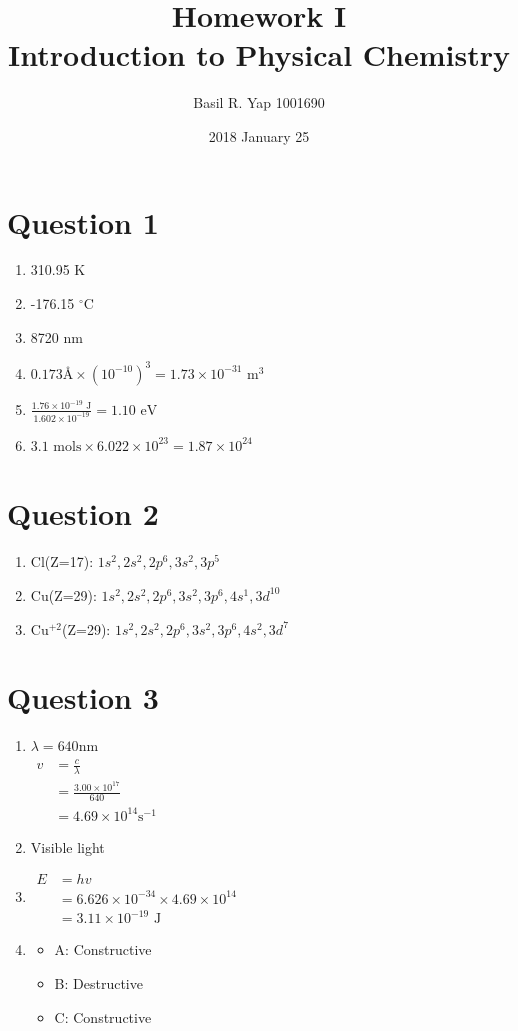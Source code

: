 \documentclass[a4paper, fleqn]{article}
\begin{document}
\title{Homework I \\ Introduction to Physical Chemistry}
\author{Basil R. Yap 1001690}
\date{2018 January 25}
\maketitle

\section{Question 1}
\begin{enumerate}[label=(\alph{*})]
\item 310.95 K
\item -176.15 $^\circ$C
\item 8720 nm
\item $0.173\text{\AA}\times(10^{-10})^3=1.73\times10^{-31}\text{ m}^3$
\item $\frac{1.76\times10^{-19}\text{ J}}{1.602\times10^{-19}}=1.10\text{ eV}$
\item $3.1 \text{ mols}\times6.022\times10^{23}=1.87\times10^{24}$
\end{enumerate}

\section{Question 2}
\begin{enumerate}[label=(\alph{*})]
\item Cl(Z=17): $1s^2,2s^2,2p^6,3s^2,3p^5$
\item Cu(Z=29): $1s^2,2s^2,2p^6,3s^2,3p^6,4s^1,3d^{10}$
\item Cu$^{+2}$(Z=29): $1s^2,2s^2,2p^6,3s^2,3p^6,4s^2,3d^7$
\end{enumerate}

\pagebreak

\section{Question 3}
\begin{enumerate}[label=(\alph{*})]
\item $\lambda=640$nm\\
$\begin{aligned}v&=\frac{c}{\lambda}\\&=\frac{3.00\times10^{17}}{640}\\&=4.69\times10^{14}\text{s}^{-1}\end{aligned}$
\item Visible light
\item $\begin{aligned}E&=hv\\&=6.626\times10^{-34}\times4.69\times10^{14}\\&=3.11\times10^{-19}\text{ J}\end{aligned}$
\item \begin{itemize}
\item A: Constructive
\item B: Destructive
\item C: Constructive
\end{itemize}
\end{enumerate}
\end{document}
